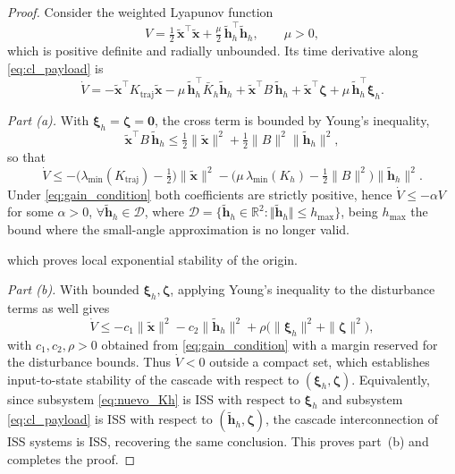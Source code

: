\documentclass[sn-mathphys-num]{sn-jnl}
\theoremstyle{thmstyleone}%
\theoremstyle{thmstyletwo}%
\theoremstyle{thmstylethree}%
\begin{document}
\begin{proof}
Consider the weighted Lyapunov function
\begin{equation}
V=\tfrac{1}{2}\,\tilde{\mathbf{x}}^\top\tilde{\mathbf{x}}
 +\tfrac{\mu}{2}\,\tilde{\mathbf{h}}_h^\top\tilde{\mathbf{h}}_h,
 \qquad \mu>0,
\label{eq:cl_lyapunov}
\end{equation}
which is positive definite and radially unbounded. Its time derivative along
\eqref{eq:cl_payload} is
\begin{equation}
\dot V=
-\tilde{\mathbf{x}}^\top K_{\mathrm{traj}}\tilde{\mathbf{x}}
-\mu\,\tilde{\mathbf{h}}_h^\top \bar{K}_h\tilde{\mathbf{h}}_h
+\tilde{\mathbf{x}}^\top B\,\tilde{\mathbf{h}}_h
+\tilde{\mathbf{x}}^\top\boldsymbol{\zeta}
+\mu\,\tilde{\mathbf{h}}_h^\top\boldsymbol{\xi}_h.
\label{eq:cl_Vdot}
\end{equation}

\emph{Part (a).} With $\boldsymbol{\xi}_h=\boldsymbol{\zeta}=\mathbf{0}$, the cross term
is bounded by Young's inequality,
\begin{equation}
\tilde{\mathbf{x}}^\top B\,\tilde{\mathbf{h}}_h
\le \tfrac{1}{2}\|\tilde{\mathbf{x}}\|^2
   +\tfrac{1}{2}\|B\|^2\|\tilde{\mathbf{h}}_h\|^2,
\label{eq:young}
\end{equation}
so that
\begin{equation}
\dot V \le
-\Big(\lambda_{\min}(K_{\mathrm{traj}})-\tfrac{1}{2}\Big)\|\tilde{\mathbf{x}}\|^2
-\Big(\mu\,\lambda_{\min}(K_h)-\tfrac{1}{2}\|B\|^2\Big)\|\tilde{\mathbf{h}}_h\|^2.
\label{eq:cl_Vdot_bound}
\end{equation}
Under \eqref{eq:gain_condition} both coefficients are strictly positive, hence
$\dot V\le -\alpha V$ for some $\alpha>0$, 
 $\forall \tilde{\mathbf{h}}_h \in \mathcal{D}$, where $\mathcal{D} = \{ \tilde{\mathbf{h}}_h \in \mathbb{R}^2 : \Vert{}\tilde{\mathbf{h}}_h\Vert{} \le h_{\max} \}$, being $h_{\max}$ the bound where the small-angle approximation is no longer valid. 

which proves local exponential stability of
the origin.

\emph{Part (b).} With bounded $\boldsymbol{\xi}_h,\boldsymbol{\zeta}$, applying Young's
inequality to the disturbance terms as well gives
\begin{equation}
\dot V \le
-c_1\|\tilde{\mathbf{x}}\|^2
-c_2\|\tilde{\mathbf{h}}_h\|^2
+\rho\big(\|\boldsymbol{\xi}_h\|^2+\|\boldsymbol{\zeta}\|^2\big),
\label{eq:cl_Vdot_iss}
\end{equation}
with $c_1,c_2,\rho>0$ obtained from \eqref{eq:gain_condition} with a margin reserved
for the disturbance bounds. Thus $\dot V<0$ outside a compact set, which establishes
input-to-state stability of the cascade with respect to
$(\boldsymbol{\xi}_h,\boldsymbol{\zeta})$. Equivalently, since subsystem
\eqref{eq:nuevo_Kh} is ISS with respect to $\boldsymbol{\xi}_h$ and subsystem
\eqref{eq:cl_payload} is ISS with respect to $(\tilde{\mathbf{h}}_h,\boldsymbol{\zeta})$, the cascade interconnection of ISS systems is ISS, recovering the same conclusion.
This proves part~(b) and completes the proof.
\end{proof}
\end{document}

